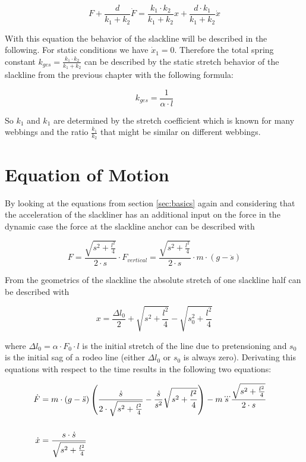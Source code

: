 \begin{equation}
	F + \frac{d}{k_1 + k_2} \dot F = \frac{k_1 \cdot k_2}{k_1 + k_2} x + \frac{d \cdot k_1}{k_1 + k_2} \dot x
	\label{eqn:linearSolidModel}
\end{equation}

With this equation the behavior of the slackline will be described in the following. For static conditions we have $\dot x_1 = 0$. Therefore the total spring constant $k_{ges} = \frac{k_1 \cdot k_2}{k_1 + k_2}$ can be described by the static stretch behavior of the slackline from the previous chapter with the following formula:

\begin{equation}
	k_{ges} = \frac{1}{\alpha \cdot l}
\end{equation}

So $k_1$ and $k_1$ are determined by the stretch coefficient which is known for many webbings and the ratio $\frac{k_1}{k_2}$ that might be similar on different webbings.

\section{Equation of Motion}

By looking at the equations from section \ref{sec:basics} again and considering that the acceleration of the slackliner has an additional input on the force in the dynamic case the force at the slackline anchor can be described with

\begin{equation}
	F = \frac{\sqrt{s^2 + \frac{l^2}{4}}}{2 \cdot s} \cdot F_{vertical} = \frac{\sqrt{s^2 + \frac{l^2}{4}}}{2 \cdot s} \cdot m\cdot (g - \ddot s)
\end{equation}

From the geometrics of the slackline the absolute stretch of one slackline half can be described with

\begin{equation}
	x = \frac{\Delta l_0}{2} + \sqrt{s^2 + \frac{l^2}{4}} - \sqrt{s_0^2 + \frac{l^2}{4}}
\end{equation}

where $\Delta l_0 = \alpha \cdot F_0 \cdot l$ is the initial stretch of the line due to pretensioning and $s_0$ is the initial sag of a rodeo line (either $\Delta l_0$ or $s_0$ is always zero). Derivating this equations with respect to the time results in the following two equations:

\begin{align}
	\dot F & \begin{multlined}[t]=  m \cdot (g - \ddot s) \left( \frac{\dot s}{2 \cdot \sqrt{s^2 + \frac{l^2}{4}}} - \frac{\dot s}{s^2} \sqrt{s^2 + \frac{l^2}{4}} \right) - \insertForSmartphone{\\}
	m \dddot s \frac{\sqrt{s^2 + \frac{l^2}{4}}}{2 \cdot s} \\
	\end{multlined}\\
	\dot x &= \frac{s \cdot \dot s}{\sqrt{s^2 + \frac{l^2}{4}}}
\end{align}

